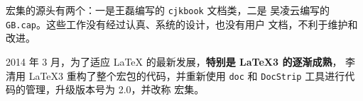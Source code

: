 \documentclass[varwidth, margin=4pt]{standalone}
\begin{document}
\qquad
\CTeX{} 宏集的源头有两个：一是{王磊}编写的 \texttt{cjkbook} 文档类，二是%
{吴凌云}编写的 \texttt{GB.cap}。这些工作没有经过认真、系统的设计，也没有用户
文档，不利于维护和改进。

\qquad
\textsf{2014 年 3 月，为了适应 \LaTeX{} 的最新发展，\textbf{特别是 \LaTeX3 的逐渐成熟}，
  {李清}用 \LaTeX3 重构了整个宏包的代码，并重新使用 \texttt{doc} 和
  \texttt{DocStrip} 工具进行代码的管理，升级版本号为 2.0，并改称 \CTeX{} 宏集。}
\end{document}
